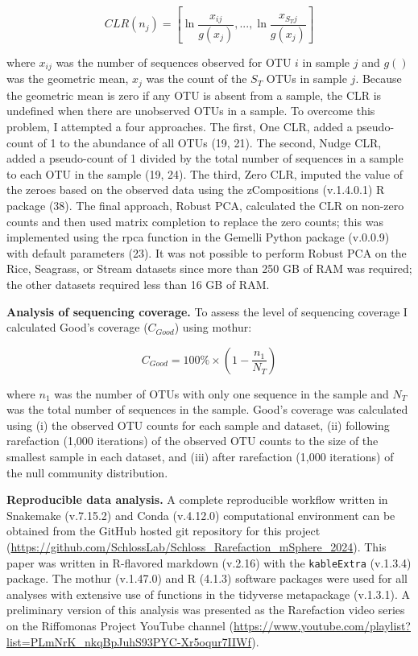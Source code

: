 \documentclass[
]{article}
\begin{document}
\[
CLR\left(n_j\right) = \left[ \ln\frac{x_{ij}}{g(x_j)}, ..., \ln\frac{x_{S_Tj}}{g(x_j)}\right]
\]

where \(x_{ij}\) was the number of sequences observed for OTU \(i\) in
sample \(j\) and \(g()\) was the geometric mean, \(x_j\) was the count
of the \(S_T\) OTUs in sample \(j\). Because the geometric mean is zero
if any OTU is absent from a sample, the CLR is undefined when there are
unobserved OTUs in a sample. To overcome this problem, I attempted a
four approaches. The first, One CLR, added a pseudo-count of 1 to the
abundance of all OTUs (19, 21). The second, Nudge CLR, added a
pseudo-count of 1 divided by the total number of sequences in a sample
to each OTU in the sample (19, 24). The third, Zero CLR, imputed the
value of the zeroes based on the observed data using the zCompositions
(v.1.4.0.1) R package (38). The final approach, Robust PCA, calculated
the CLR on non-zero counts and then used matrix completion to replace
the zero counts; this was implemented using the rpca function in the
Gemelli Python package (v.0.0.9) with default parameters (23). It was
not possible to perform Robust PCA on the Rice, Seagrass, or Stream
datasets since more than 250 GB of RAM was required; the other datasets
required less than 16 GB of RAM.

\textbf{Analysis of sequencing coverage.} To assess the level of
sequencing coverage I calculated Good's coverage (\(C_{Good}\)) using
mothur:

\[C_{Good} = 100\% \times \left(1-\frac{n_1}{N_T} \right)\]

where \(n_1\) was the number of OTUs with only one sequence in the
sample and \(N_T\) was the total number of sequences in the sample.
Good's coverage was calculated using (i) the observed OTU counts for
each sample and dataset, (ii) following rarefaction (1,000 iterations)
of the observed OTU counts to the size of the smallest sample in each
dataset, and (iii) after rarefaction (1,000 iterations) of the null
community distribution.

\textbf{Reproducible data analysis.} A complete reproducible workflow
written in Snakemake (v.7.15.2) and Conda (v.4.12.0) computational
environment can be obtained from the GitHub hosted git repository for
this project
(\url{https://github.com/SchlossLab/Schloss_Rarefaction_mSphere_2024}).
This paper was written in R-flavored markdown (v.2.16) with the
\texttt{kableExtra} (v.1.3.4) package. The mothur (v.1.47.0) and R
(4.1.3) software packages were used for all analyses with extensive use
of functions in the tidyverse metapackage (v.1.3.1). A preliminary
version of this analysis was presented as the Rarefaction video series
on the Riffomonas Project YouTube channel
(\url{https://www.youtube.com/playlist?list=PLmNrK_nkqBpJuhS93PYC-Xr5oqur7IIWf}).
\end{document}

